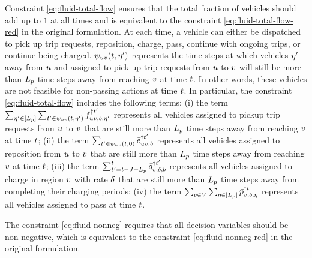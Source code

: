 Constraint \eqref{eq:fluid-total-flow} ensures that the total fraction of vehicles should add up to $1$ at all times and is equivalent to the constraint \eqref{eq:fluid-total-flow-red} in the original formulation. At each time, a vehicle can either be dispatched to pick up trip requests, reposition, charge, pass, continue with ongoing trips, or continue being charged. $\psi_{\origin \destination}(t, \timetoarrival')$ represents the time steps at which vehicles $\timetoarrival'$ away from $\origin$ and assigned to pick up trip requests from $\origin$ to $\destination$ will still be more than $\Lp$ time steps away from reaching $\destination$ at time $\time$. In other words, these vehicles are not feasible for non-passing actions at time $\time$. In particular, the constraint \eqref{eq:fluid-total-flow} includes the following terms: (i) the term $\sum_{\timetoarrival' \in [\Lp]}^{} \sum_{t' \in \psi_{\origin \destination}(t, \eta')}\lpredtripfulfill{\origin \destination, b, \eta'}{t'}$ represents all vehicles assigned to pickup trip requests from $\origin$ to $\destination$ that are still more than $\Lp$ time steps away from reaching $\destination$ at time $\time$; (ii) the term $\sum_{t' \in \psi_{\origin \destination}(t, 0)} \lpredreroute{\origin \destination, b}{t'}$ represents all vehicles assigned to reposition from $\origin$ to $\destination$ that are still more than $\Lp$ time steps away from reaching $\destination$ at time $\time$; (iii) the term $\sum_{t' = t-\chargetime + \Lp}^t \lpredcharge{\region,\type,\battery}{t'}$ represents all vehicles assigned to charge in region $\region$ with rate $\type$ that are still more than $\Lp$ time steps away from completing their charging periods; (iv) the term $\sum_{\region \in \Region} \sum_{\timetoarrival \in [\Lp]}^{} \lpredpass{\region, \battery, \timetoarrival}{\time}$ represents all vehicles assigned to pass at time $\time$. 

The constraint \eqref{eq:fluid-nonneg} requires that all decision variables should be non-negative, which is equivalent to the constraint \eqref{eq:fluid-nonneg-red} in the original formulation.
